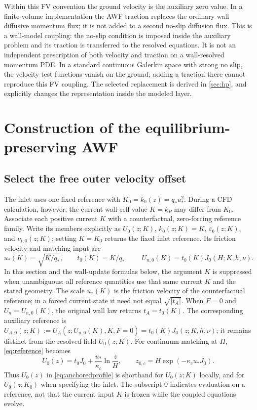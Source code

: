 \documentclass[11pt,a4paper]{article}
\numberwithin{equation}{section}
\newcommand{\eps}{\varepsilon}
\newcommand{\ust}{u_*}
\newcommand{\kc}{\kappa_c}
\newcommand{\qs}{q_*}
\begin{document}
Within this FV convention the ground velocity is the auxiliary zero
value. In a finite-volume
implementation the AWF traction replaces the ordinary wall diffusive
momentum flux; it is not added to a second no-slip diffusion flux.
This is a wall-model coupling: the no-slip condition is imposed inside the
auxiliary problem and its traction is transferred to the resolved equations.
It is not an independent prescription of both velocity and traction on a
wall-resolved momentum PDE. In a standard continuous Galerkin space
with strong no slip, the velocity test functions vanish on the ground;
adding a traction there cannot reproduce this FV coupling. The selected
replacement is derived in \cref{sec:hp}, and explicitly changes the
representation inside the modeled layer.

\section{Construction of the equilibrium-preserving AWF}
\label{sec:proposed}
\subsection{Select the free outer velocity offset}
The inlet uses one fixed reference with $K_0=k_0(z)=\qs\ust^2$.
During a CFD calculation, however, the current wall-cell value
$K=k_P$ may differ from $K_0$. Associate each positive current $K$
with a counterfactual, zero-forcing reference family. Write its
members explicitly as $U_0(z;K)$, $k_0(z;K)=K$,
$\eps_0(z;K)$, and $\nu_{t,0}(z;K)$; setting $K=K_0$ returns the
fixed inlet reference. Its friction velocity and matching input are
\begin{equation}
 \ust(K)=\sqrt{K/\qs},\qquad t_0(K)=K/\qs,\qquad
 \boxed{U_{n,0}(K)=t_0(K)J_0(H;K,h,\nu).}
 \label{eq:anchor}
\end{equation}
In this section and the wall-update formulas below, the argument $K$
is suppressed when unambiguous: all reference quantities use that same
current $K$ and the stated geometry. The scale $\ust(K)$ is the friction
velocity of the counterfactual reference; in a forced current state it
need not equal $\sqrt{|t_A|}$. When $F=0$ and $U_n=U_{n,0}(K)$,
the original wall law returns $t_A=t_0(K)$. The corresponding auxiliary
reference is $U_{A,0}(z;K):=U_A(z;U_{n,0}(K),K,F=0)=t_0(K)J_0(z;K,h,\nu)$;
it remains distinct from the resolved field $U_0(z;K)$.
For continuum matching at $H$, \cref{eq:reference} becomes
\begin{equation}
 U_0(z)=t_0J_0+\frac{\ust}{\kc}\ln\frac zH,\qquad
 z_{0,c}=H\exp(-\kc\ust J_0).
 \label{eq:anchoredprofile}
\end{equation}
Thus $U_0(z)$ in \cref{eq:anchoredprofile} is shorthand for
$U_0(z;K)$ locally, and for $U_0(z;K_0)$ when specifying the inlet.
The subscript $0$ indicates evaluation on a reference, not that the
current input $K$ is frozen while the coupled equations evolve.
\end{document}
